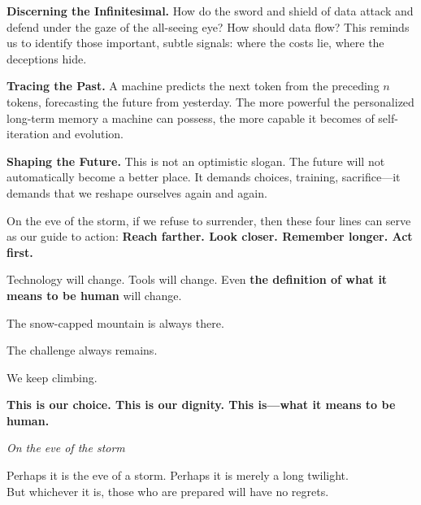 \textbf{Discerning the Infinitesimal.}
How do the sword and shield of data attack and defend under the gaze of the all-seeing eye? How should data flow? This reminds us to identify those important, subtle signals: where the costs lie, where the deceptions hide.

\vspace{1em}

\textbf{Tracing the Past.}
A machine predicts the next token from the preceding $n$ tokens, forecasting the future from yesterday. The more powerful the personalized long-term memory a machine can possess, the more capable it becomes of self-iteration and evolution.

\vspace{1em}

\textbf{Shaping the Future.} This is not an optimistic slogan. The future will not automatically become a better place. It demands choices, training, sacrifice---it demands that we reshape ourselves again and again.

\vspace{1em}

On the eve of the storm, if we refuse to surrender, then these four lines can serve as our guide to action:
\textbf{Reach farther. Look closer. Remember longer. Act first.}

\vspace{1em}

Technology will change. Tools will change. Even \textbf{the definition of what it means to be human} will change.

The snow-capped mountain is always there.

The challenge always remains.

We keep climbing.

\textbf{This is our choice. This is our dignity. This is---what it means to be human.}

\vspace{2em}
\begin{flushright}
\textit{On the eve of the storm}

\vspace{1em}

{\small Perhaps it is the eve of a storm. Perhaps it is merely a long twilight.\\
But whichever it is, those who are prepared will have no regrets.}
\end{flushright}